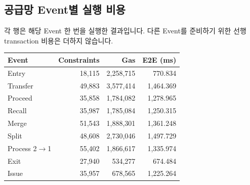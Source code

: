 \documentclass[11pt,a4paper]{article}
\begin{document}
\par\noindent\begin{minipage}{\linewidth}
\subsection*{공급망 Event별 실행 비용}
각 행은 해당 Event 한 번을 실행한 결과입니다.\newline
다른 Event를 준비하기 위한 선행 transaction 비용은 더하지 않습니다.\par\smallskip
\begin{center}\small\begin{tabular}{@{}lrrr@{}}\toprule
\textbf{Event} & \textbf{Constraints} & \textbf{Gas} & \textbf{E2E (ms)} \\
\midrule
Entry & 18,115 & 2,258,715 & 770.834 \\
Transfer & 49,883 & 3,577,414 & 1,464.369 \\
Proceed & 35,858 & 1,784,082 & 1,278.965 \\
Recall & 35,987 & 1,785,084 & 1,250.315 \\
Merge & 51,543 & 1,888,301 & 1,361.248 \\
Split & 48,608 & 2,730,046 & 1,497.729 \\
Process 2$\rightarrow$1 & 55,402 & 1,866,617 & 1,335.974 \\
Exit & 27,940 & 534,277 & 674.484 \\
Issue & 35,957 & 678,565 & 1,225.264 \\
\bottomrule\end{tabular}\end{center}
\end{minipage}\par\medskip
\end{document}
